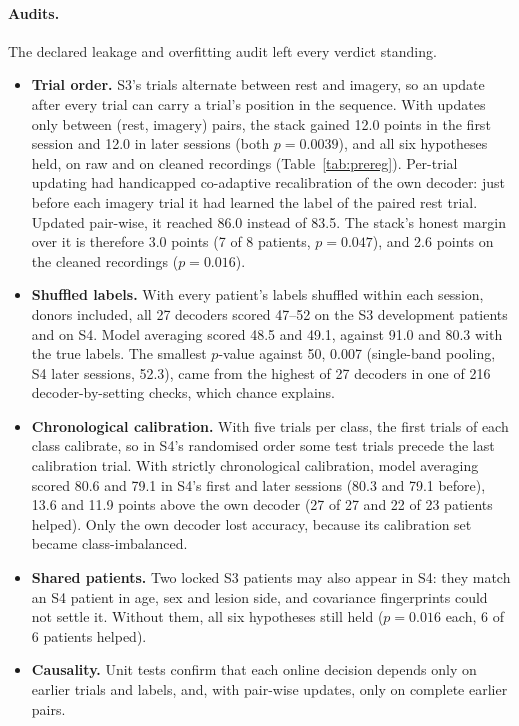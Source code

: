 \paragraph{Audits.}\label{sec:audit} The declared leakage and overfitting audit left every verdict standing.
\begin{itemize}
  \item \textbf{Trial order.} S3's trials alternate between rest and imagery, so an update after every trial can carry a trial's position in the sequence. With updates only between (rest, imagery) pairs, the stack gained 12.0 points in the first session and 12.0 in later sessions (both $p = 0.0039$), and all six hypotheses held, on raw and on cleaned recordings (Table~\ref{tab:prereg}). Per-trial updating had handicapped co-adaptive recalibration of the own decoder: just before each imagery trial it had learned the label of the paired rest trial. Updated pair-wise, it reached 86.0\pct{} instead of 83.5\pct{}. The stack's honest margin over it is therefore 3.0 points (7 of 8 patients, $p = 0.047$), and 2.6 points on the cleaned recordings ($p = 0.016$).
  \item \textbf{Shuffled labels.} With every patient's labels shuffled within each session, donors included, all 27 decoders scored 47--52\pct{} on the S3 development patients and on S4. Model averaging scored 48.5\pct{} and 49.1\pct{}, against 91.0\pct{} and 80.3\pct{} with the true labels. The smallest $p$-value against 50\pct{}, 0.007 (single-band pooling, S4 later sessions, 52.3\pct{}), came from the highest of 27 decoders in one of 216 decoder-by-setting checks, which chance explains.
  \item \textbf{Chronological calibration.} With five trials per class, the first trials of each class calibrate, so in S4's randomised order some test trials precede the last calibration trial. With strictly chronological calibration, model averaging scored 80.6\pct{} and 79.1\pct{} in S4's first and later sessions (80.3\pct{} and 79.1\pct{} before), 13.6 and 11.9 points above the own decoder (27 of 27 and 22 of 23 patients helped). Only the own decoder lost accuracy, because its calibration set became class-imbalanced.
  \item \textbf{Shared patients.} Two locked S3 patients may also appear in S4: they match an S4 patient in age, sex and lesion side, and covariance fingerprints could not settle it. Without them, all six hypotheses still held ($p = 0.016$ each, 6 of 6 patients helped).
  \item \textbf{Causality.} Unit tests confirm that each online decision depends only on earlier trials and labels, and, with pair-wise updates, only on complete earlier pairs.
\end{itemize}

